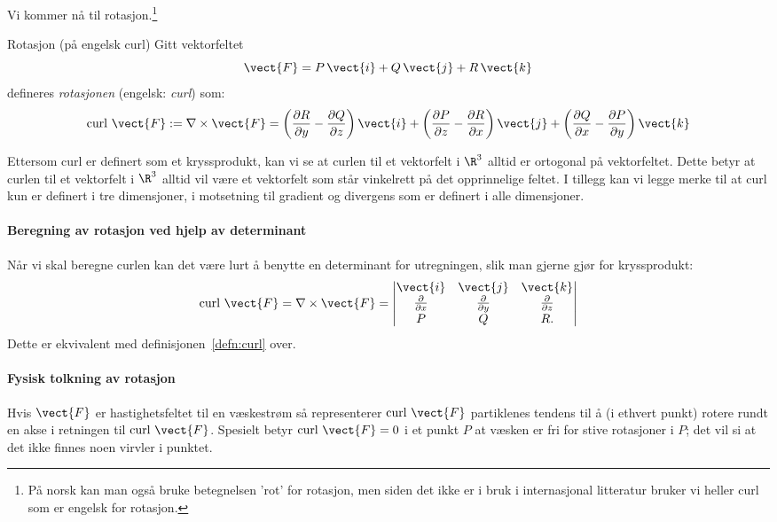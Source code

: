 Vi kommer nå til rotasjon.\footnote{På norsk kan man også bruke betegnelsen 'rot' for rotasjon, men siden det ikke er i bruk i internasjonal litteratur bruker vi heller curl som er engelsk for rotasjon.}

\begin{defn}{Rotasjon (på engelsk curl)}
Gitt vektorfeltet
\[
\vect{F} = P\, \vect{i} + Q\, \vect{j} + R\, \vect{k}
\]
defineres \emph{rotasjonen} (engelsk: \emph{curl}) som:
\[
\text{curl } \vect{F} :=\nabla\times\vect{F}=
\left( \frac{\partial R}{\partial y} - \frac{\partial Q}{\partial z} \right)\vect{i}
+ \left( \frac{\partial P}{\partial z} - \frac{\partial R}{\partial x} \right)\vect{j}
+ \left( \frac{\partial Q}{\partial x} - \frac{\partial P}{\partial y} \right)\vect{k}
\]
\label{defn:curl}
\end{defn}

Ettersom curl er definert som et kryssprodukt, kan vi se at curlen til et vektorfelt i $\R^3$ alltid er ortogonal på vektorfeltet. Dette betyr at curlen til et vektorfelt i $\R^3$ alltid vil være et vektorfelt som står vinkelrett på det opprinnelige feltet. I tillegg kan vi legge merke til at curl kun er definert i tre dimensjoner, i motsetning til gradient og divergens som er definert i alle dimensjoner. 

\paragraph{Beregning av rotasjon ved hjelp av determinant}
Når vi skal beregne curlen kan det være lurt å benytte en determinant for utregningen, slik man gjerne gjør for kryssprodukt:
\[
\text{curl } \vect{F} = \nabla \times \vect{F} =
\begin{vmatrix}
\vect{i} & \vect{j} & \vect{k} \\
\frac{\partial}{\partial x} & \frac{\partial}{\partial y} & \frac{\partial}{\partial z} \\
P & Q & R.
\end{vmatrix}
\]
Dette er ekvivalent med definisjonen~\ref{defn:curl} over.


\paragraph{Fysisk tolkning av rotasjon} Hvis $\vect{F}$ er hastighetsfeltet til en væskestrøm så representerer $\text{curl } \vect{F}$ partiklenes tendens til å (i ethvert punkt) rotere rundt en akse i retningen til $\text{curl } \vect{F}$. Spesielt betyr $\text{curl } \vect{F} = 0$ i et punkt $P$ at væsken er fri for stive rotasjoner i $P$; det vil si at det ikke finnes noen virvler i punktet. 

